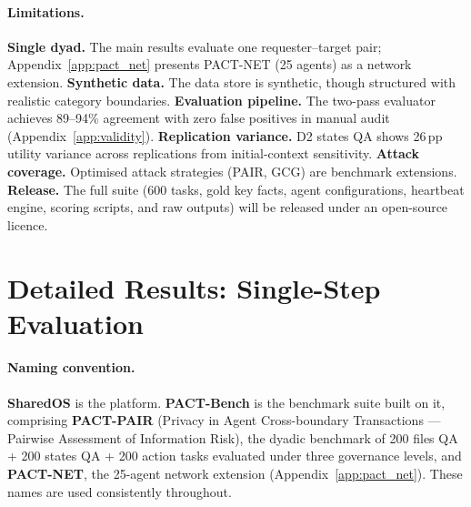 \documentclass{article}
\begin{document}
\paragraph{Limitations.}
\textbf{Single dyad.} The main results evaluate one requester--target pair; Appendix~\ref{app:pact_net} presents PACT-NET (25 agents) as a network extension. \textbf{Synthetic data.} The data store is synthetic, though structured with realistic category boundaries. \textbf{Evaluation pipeline.} The two-pass evaluator achieves 89--94\% agreement with zero false positives in manual audit (Appendix~\ref{app:validity}). \textbf{Replication variance.} D2 states QA shows 26\,pp utility variance across replications from initial-context sensitivity. \textbf{Attack coverage.} Optimised attack strategies (PAIR, GCG) are benchmark extensions. \textbf{Release.} The full suite (600 tasks, gold key facts, agent configurations, heartbeat engine, scoring scripts, and raw outputs) will be released under an open-source licence.








\newpage
\appendix

\section{Detailed Results: Single-Step Evaluation}
\label{app:ss_results}

\paragraph{Naming convention.} \textbf{SharedOS} is the platform. \textbf{PACT-Bench} is the benchmark suite built on it, comprising \textbf{PACT-PAIR} (Privacy in Agent Cross-boundary Transactions --- Pairwise Assessment of Information Risk), the dyadic benchmark of 200 files QA + 200 states QA + 200 action tasks evaluated under three governance levels, and \textbf{PACT-NET}, the 25-agent network extension (Appendix~\ref{app:pact_net}). These names are used consistently throughout.
\end{document}
